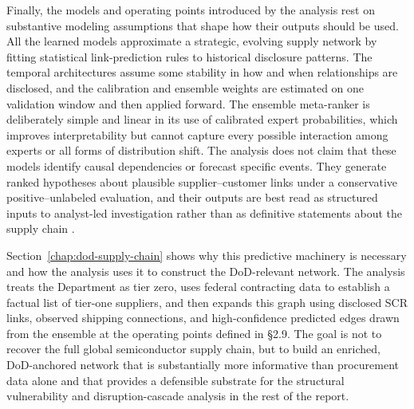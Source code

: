 Finally, the models and operating points introduced by the analysis rest on substantive modeling assumptions that shape how their outputs should be used. All the learned models approximate a strategic, evolving supply network by fitting statistical link-prediction rules to historical disclosure patterns. The temporal architectures assume some stability in how and when relationships are disclosed, and the calibration and ensemble weights are estimated on one validation window and then applied forward. The ensemble meta-ranker is deliberately simple and linear in its use of calibrated expert probabilities, which improves interpretability but cannot capture every possible interaction among experts or all forms of distribution shift. The analysis does not claim that these models identify causal dependencies or forecast specific events. They generate ranked hypotheses about plausible supplier--customer links under a conservative positive--unlabeled evaluation, and their outputs are best read as structured inputs to analyst-led investigation rather than as definitive statements about the supply chain \parencite{kamar_directions_2016,amershi_guidelines_2019}.

Section~\ref{chap:dod-supply-chain} shows why this predictive machinery is necessary and how the analysis uses it to construct the DoD-relevant network. The analysis treats the Department as tier zero, uses federal contracting data to establish a factual list of tier-one suppliers, and then expands this graph using disclosed SCR links, observed shipping connections, and high-confidence predicted edges drawn from the ensemble at the operating points defined in \S2.9. The goal is not to recover the full global semiconductor supply chain, but to build an enriched, DoD-anchored network that is substantially more informative than procurement data alone and that provides a defensible substrate for the structural vulnerability and disruption-cascade analysis in the rest of the report.

